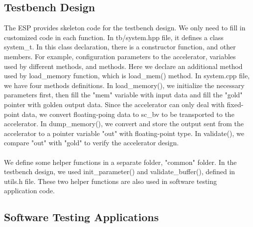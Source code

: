 \documentclass{sig-alternate}
\begin{document}
\subsection{Testbench Design}
 The ESP provides skeleton code for the testbench design. We only need to fill in customized code in each function. In tb/system.hpp file, it defines a class system\_t. In this class declaration, there is a constructor function, and other members. For example, configuration parameters to the accelerator, variables used by different methods, and methods. Here we declare an additional method used by load\_memory function, which is load\_mem() method. In system.cpp file, we have four methods definitions. In load\_memory(), we initialize the necessary parameters first, then fill the "mem" variable with input data and fill the "gold" pointer with golden output data. Since the accelerator can only deal with fixed-point data, we convert floating-poing data to sc\_bv to be transported to the accelerator. In dump\_memory(), we convert and store the output sent from the accelerator to a pointer variable "out" with floating-point type. In validate(), we compare "out" with "gold" to verify the accelerator design. \\
 \\
 We define some helper functions in a separate folder, "common" folder. In the testbench design, we used init\_parameter() and validate\_buffer(), defined in utils.h file. These two helper functions are also used in software testing application code.\\

\subsection{Software Testing Applications}
\end{document}

